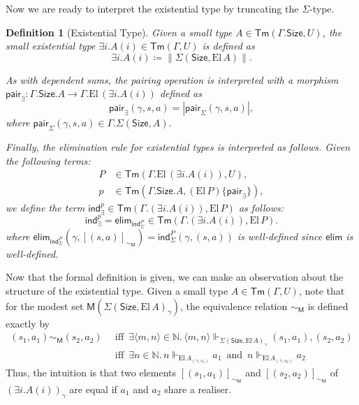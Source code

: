 \documentclass[10pt,a4paper]{article}
\newtheorem{definition}[theorem]{Definition}
\theoremstyle{definition}
\theoremstyle{remark}
\renewcommand{\.}{.\,} %
\renewcommand{\:}{:} %
\newcommand{\bN}{\mathbb{N}}
\newcommand{\El}{\mathrm{El}\,}
\newcommand{\Size}{\mathsf{Size}}
\newcommand{\pair}{\mathsf{pair} }
\newcommand{\ind}{\mathsf{ind}}
\newcommand{\0}{\mathbf{0}}
\newcommand{\1}{\mathbf{1}}
\newcommand\<\langle
\renewcommand\>\rangle
\newcommand{\M}{\mathsf{M}}
\newcommand{\Tr}[1]{{\|{#1}\|}}
\newcommand{\tr}[1]{|{#1}|}
\newcommand{\elim}{\mathsf{elim}}
\newcommand{\Tm}{\mathsf{Tm}}
\newcommand{\U}{U}
\newcommand{\Iff}{\hspace{6pt}\text{iff}\hspace{6pt}}
\renewcommand{\and}{\hspace{6pt}\text{and}\hspace{6pt}}
\theoremstyle{remark}
\begin{document}
Now we are ready to interpret the existential type by truncating the $\Sigma$-type.
\begin{definition}[Existential Type]
	Given a small type $A \in \Tm(\Gamma.\Size, \U)$, the small existential type $\exists i . A(i) \in \Tm(\Gamma, \U)$ is defined as 
	\[\exists i . A(i) \coloneq  \Tr{\Sigma(\Size, \El A)}.\]
	
	As with dependent sums, the pairing operation is interpreted with a morphism $\pair_\exists : \Gamma.\Size.A \to \Gamma. \El (\exists i.A(i))$ defined as 
	\[
	\pair_\exists(\gamma, s, a) = \tr{\pair_\Sigma(\gamma, s, a)},
	\]
	where $\pair_\Sigma(\gamma, s, a) \in \Gamma.\Sigma(\Size, A)$.

	Finally, the elimination rule for existential types is interpreted as follows. Given the following terms:
	\begin{align*}
		P &\in \Tm(\Gamma. \El (\exists i.A(i)), \U),\\
		p &\in \Tm(\Gamma.\Size.A, (\El P)\{\pair_\exists\}),
	\end{align*}
    we define the term $\ind_\exists^{p} \in \Tm(\Gamma.(\exists i. A(i)), \El P)$ as follows:
	\[
		\ind_\exists^{p} = \elim_{\ind_{\Sigma}^{P}} \in \Tm(\Gamma.(\exists i. A(i)), \El P).
	\]
	where $ \elim_{\ind_{\Sigma}^{P}}(\gamma, [(s, a)]_{\sim_\M}) = \ind_{\Sigma}^{P}(\gamma, (s, a))$ is well-defined since $\elim$ is well-defined.

\end{definition}

Now that the formal definition is given, we can make an observation about the structure of the existential type. Given a small type $A \in \Tm(\Gamma, \U)$, note that for the modest set $\M (\Sigma(\Size, \El A)_\gamma)$, the equivalence relation $\sim_\M$ is defined exactly by
\begin{align*}
	(s_1, a_1) \sim_\M (s_2, a_2) &\Iff \exists \langle m, n \rangle \in \bN \. \langle m, n \rangle \Vdash_{\Sigma(\Size, \El A)_\gamma} (s_1, a_1), (s_2, a_2) \\
	&\Iff \exists n \in \bN \. n \Vdash_{\El A_{(\gamma, s_1)}} a_1 \and n \Vdash_{\El A_{(\gamma, s_2)}} a_2
\end{align*} 
Thus, the intuition is that two elements $[(s_1, a_1)]_{\sim_\M}$ and $[(s_2, a_2)]_{\sim_\M}$ of $(\exists i . A(i))_\gamma$ are equal if $a_1$ and $a_2$ share a realiser.



\end{document}
